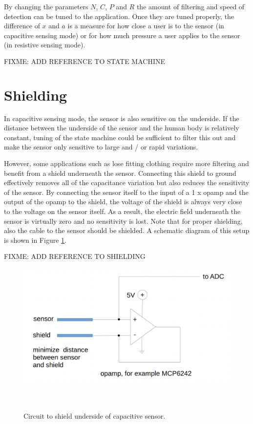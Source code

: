 \documentclass{sigchi-ext}
\begin{document}
By changing the parameters $N$, $C$, $P$ and $R$ the amount of filtering and
speed of detection can be tuned to the application. Once they are tuned
properly, the difference of $x$ and $a$ is a measure for how close a user is to
the sensor (in capacitive sensing mode) or for how much pressure a user applies
to the sensor (in resistive sensing mode).

FIXME: ADD REFERENCE TO STATE MACHINE 

\section{Shielding}
In capacitive sensing mode, the sensor is also sensitive on the underside. If
the distance between the underside of the sensor and the human body is
relatively constant, tuning of the state machine could be sufficient to filter
this out and make the sensor only sensitive to large and / or rapid variations.

However, some applications such as lose fitting clothing require more filtering
and benefit from a shield underneath the
sensor. Connecting this shield to ground effectively removes all of the
capacitance variation but also reduces the sensitivity of the sensor. By
connecting the sensor itself to the input of a 1 x opamp and the output of the
opamp to the shield, the voltage of the shield is always very close to the
voltage on the sensor itself. As a result, the electric field underneath the
sensor is virtually zero and no sensitivity is lost. Note that for proper
shielding, also the cable to the sensor should be shielded. A schematic diagram
of this setup is shown in Figure \ref{fig:shield_circuit}.

FIXME: ADD REFERENCE TO SHIELDING

\begin{figure}
\centering
\includegraphics[width=0.9\columnwidth]{figures/shield_circuit}
  \caption{Circuit to shield underside of capacitive
sensor.}~\label{fig:shield_circuit}
\end{figure}
\end{document}

